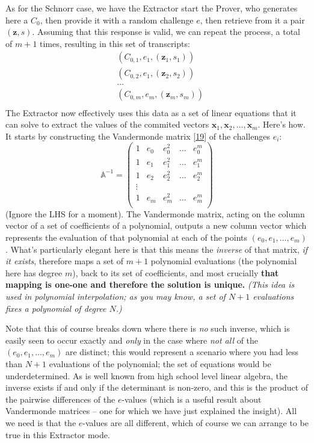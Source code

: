 \documentclass[10pt,a4paper]{article}
\begin{document}
As for the Schnorr case, we have the Extractor start the Prover, who
generates here a $C_0$, then provide it with a random challenge $e$, then
retrieve from it a pair $(\mathbf{z}, s)$. Assuming that this response is
valid, we can repeat the process, a total of $m+1$ times, resulting in this
set of transcripts:
\begin{align*}
&(C_{0,1}, e_1, (\mathbf{z}_1 , s_1)) \\
&(C_{0,2}, e_1, (\mathbf{z}_2 , s_2)) \\
&\ldots \\
&(C_{0,m}, e_m, (\mathbf{z}_m , s_m)) \\
\end{align*}
The Extractor now effectively uses this data as a set of linear
equations that it can solve to extract the values of the commited
vectors $\mathbf{x}_1, \mathbf{x}_2, \ldots, \mathbf{x}_m$. Here's how. It starts by constructing the Vandermonde matrix
{[}\protect\hyperlink{anchor-30}{19}{]} of the challenges $e_i$:
\[
\mathbb{A}^{-1} = \begin{pmatrix}
1 & e_0 & e_0^2 & \dots & e_0^m \\
1 & e_1 & e_1^2 & \dots & e_1^m \\
1 & e_2 & e_2^2 & \dots & e_2^m \\
\vdots  \\
1 & e_m & e_m^2 & \dots & e_m^m \\
\end{pmatrix}
\]
(Ignore the LHS for a moment). The Vandermonde matrix, acting on the
column vector of a set of coefficients of a polynomial, outputs a new
column vector which represents the evaluation of that polynomial at each
of the points $(e_0, e_1, \ldots , e_m)$. What's particularly elegant here is that this means the
\emph{inverse} of that matrix, \emph{if it exists}, therefore maps a set
of $m+1$ polynomial evaluations (the polynomial here has degree $m$), back to its
set of coefficients, and most crucially \textbf{that mapping is one-one
and therefore the solution is unique. }\emph{(This idea is used in
polynomial interpolation; as you may know, a set of $N+1$ evaluations
fixes a polynomial of degree $N$.)}

Note that this of course breaks down where there is \emph{no} such
inverse, which is easily seen to occur exactly and \emph{only} in the
case where \emph{not all }of the $(e_0, e_1, \ldots , e_m)$ are distinct; this would represent a
scenario where you had less than $N+1$ evaluations of the polynomial; the set
of equations would be underdetermined. As is well known from high school
level linear algebra, the inverse exists if and only if the determinant
is non-zero, and this is the product of the pairwise differences of the
$e$-values (which is a useful result about Vandermonde matrices -- one for
which we have just explained the insight). All we need is that the
$e$-values are all different, which of course we can arrange to be true in
this Extractor mode.
\end{document}
